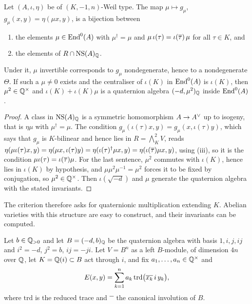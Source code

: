 \begin{lemma}\label{lem:Rendomorphism}
Let $(A,\iota,\eta)$ be of $(K,-1,n)$-Weil type. The map $\mu\mapsto
g_{\mu}$, $g_{\mu}(x,y)=\eta(\mu x,y)$, is a bijection between
\begin{enumerate}[label=\textup{(\alph*)},nosep]
\item the elements $\mu\in\operatorname{End}^{0}(A)$ with $\mu^{\dagger}=\mu$ and
  $\mu\,\iota(\tau)=\iota(\overline{\tau})\,\mu$ for all $\tau\in K$, and
\item the elements of $R\cap\mathrm{NS}(A)_{\mathbb{Q}}$.
\end{enumerate}
Under it, $\mu$ invertible corresponds to $g_{\mu}$ nondegenerate, hence to a
nondegenerate $\Theta$. If such a $\mu\ne0$ exists and the centraliser of
$\iota(K)$ in $\operatorname{End}^{0}(A)$ is $\iota(K)$, then $\mu^{2}\in\mathbb{Q}^{\times}$ and
$\iota(K)+\iota(K)\mu$ is a quaternion algebra $(-d,\mu^{2})_{\mathbb{Q}}$ inside
$\operatorname{End}^{0}(A)$.
\end{lemma}

\begin{proof}
A class in $\mathrm{NS}(A)_{\mathbb{Q}}$ is a symmetric homomorphism $A\to A^{\vee}$ up to isogeny,
that is $\eta\mu$ with $\mu^{\dagger}=\mu$. The condition
$g_{\mu}(\iota(\tau)x,y)=g_{\mu}(x,\iota(\tau)y)$, which says that $g_{\mu}$ is
$K$-bilinear and hence lies in $R=\bigwedge^{2}_{K}V$, reads
$\eta(\mu\iota(\tau)x,y)=\eta(\mu x,\iota(\tau)y)=\eta(\iota(\tau)^{\dagger}\mu
x,y)=\eta(\iota(\overline{\tau})\mu x,y)$, using (iii), so it
is the condition $\mu\iota(\tau)=\iota(\overline{\tau})\mu$. For the last sentence,
$\mu^{2}$ commutes with $\iota(K)$, hence lies in $\iota(K)$ by hypothesis, and
$\mu\mu^{2}\mu^{-1}=\mu^{2}$ forces it to be fixed by conjugation, so
$\mu^{2}\in\mathbb{Q}^{\times}$. Then $\iota(\sqrt{-d})$ and $\mu$ generate the
quaternion algebra with the stated invariants.
\end{proof}

The criterion therefore asks for quaternionic multiplication extending $K$.
Abelian varieties with this structure are easy to construct, and their
invariants can be computed.

\begin{setupenv}\label{setup:quat}
Let $b\in\mathbb{Q}_{>0}$ and let $B=(-d,b)_{\mathbb{Q}}$ be the quaternion algebra with
basis $1,i,j,ij$ and $i^{2}=-d$, $j^{2}=b$, $ij=-ji$. Let
$V=B^{n}$ as a left $B$-module, of dimension $4n$ over $\mathbb{Q}$, let
$K=\mathbb{Q}(i)\subset B$ act through $i$, and fix $a_{1},\dots,a_{n}\in\mathbb{Q}^{\times}$
and
\begin{equation}\label{eq:quatE}
  E(x,y)=\sum_{k=1}^{n}a_{k}\,\mathrm{trd}\bigl(\overline{x_{k}}\,i\,y_{k}\bigr),
\end{equation}
where $\mathrm{trd}$ is the reduced trace and $\overline{\phantom{x}}$ the
canonical involution of $B$.
\end{setupenv}

